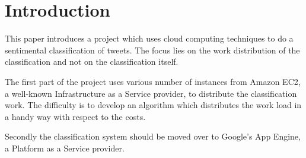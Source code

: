 \section{Introduction}
%
%

%




This paper introduces a project which uses cloud computing techniques to do a sentimental classification of tweets. The focus lies on the work distribution of the classification and not on the classification itself. 

The first part of the project uses various number of instances from Amazon EC2, a well-known Infrastructure as a Service provider, to distribute the classification work. The difficulty is to develop an algorithm which distributes the work load in a handy way with respect to the costs.

Secondly the classification system should be moved over to Google's App Engine, a Platform as a Service provider.
